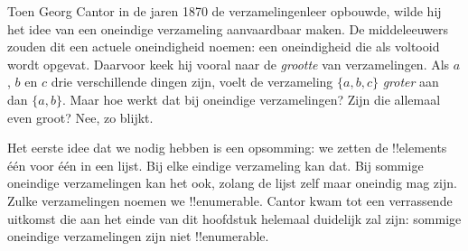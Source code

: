 \documentclass[../../../include/open-logic-section]{subfiles}
\begin{document}


Toen Georg Cantor in de jaren 1870 de verzamelingenleer opbouwde, wilde hij het
idee van een oneindige verzameling aanvaardbaar maken. De
middeleeuwers zouden dit een actuele oneindigheid noemen: een oneindigheid die
als voltooid wordt opgevat. Daarvoor keek hij vooral naar de \emph{grootte} van
verzamelingen. Als $a$, $b$ en $c$
drie verschillende dingen zijn, voelt de verzameling $\{a, b, c\}$
\emph{groter} aan dan $\{a, b\}$. Maar hoe werkt dat bij oneindige
verzamelingen? Zijn die allemaal even groot? Nee, zo blijkt.

Het eerste idee dat we nodig hebben is een opsomming: we zetten de
!!{element}s één voor één in een lijst. Bij elke eindige verzameling kan dat.
Bij sommige oneindige verzamelingen kan het ook, zolang de lijst zelf maar
oneindig mag zijn. Zulke verzamelingen noemen we !!{enumerable}. Cantor kwam
tot een verrassende uitkomst die aan het einde van dit hoofdstuk helemaal
duidelijk zal zijn: sommige oneindige verzamelingen zijn niet !!{enumerable}.
\end{document}
